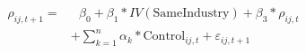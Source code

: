 \begin{equation*}
\begin{split}
\rho_{ij,t+1} = & \text{ 	}\beta_0 + \beta_1* IV(\text{SameIndustry}) +\beta_3* \rho_{ij,t} \\
&+ \sum_{k=1} ^{n} \alpha_k*\text{Control}_{ij,t} + \varepsilon_{ij,t+1}
\end{split}
\end{equation*}